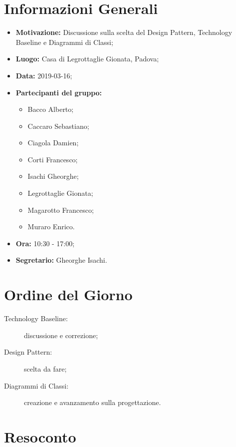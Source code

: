 \documentclass[a4paper, oneside, openany, dvipsnames, table]{article}
\begin{document}
\copertina{}


\newpage
\tableofcontents
\newpage
\section{Informazioni Generali}
\begin{itemize}
\item \textbf{Motivazione:} Discussione sulla scelta del Design Pattern, Technology Baseline e Diagrammi di Classi;
\item \textbf{Luogo:} Casa di Legrottaglie Gionata, Padova;
\item \textbf{Data:} 2019-03-16;
\item \textbf{Partecipanti del gruppo:} \hfill
	\begin{itemize}
	\item Bacco Alberto;
	\item Caccaro Sebastiano;
	\item Ciagola Damien;
	\item Corti Francesco;
	\item Isachi Gheorghe;
	\item Legrottaglie Gionata;
	\item Magarotto Francesco;
	\item Muraro Enrico.
	\end{itemize} 
\item \textbf{Ora:} 10:30 - 17:00;
\item \textbf{Segretario:} Gheorghe Isachi.
\end{itemize}

\section{Ordine del Giorno}
\begin{description}
\item [Technology Baseline:] discussione e correzione;
\item [Design Pattern:] scelta da fare; 
\item [Diagrammi di Classi:] creazione e avanzamento sulla progettazione.
\end{description}

\section{Resoconto}
\end{document}
